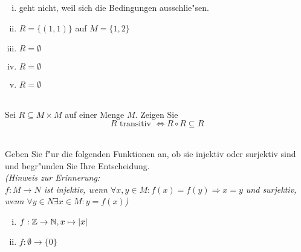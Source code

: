 \begin{loesung}
\begin{enumerate}[(i)]
\item geht nicht, weil sich die Bedingungen ausschlie"sen.
\item $R=\{(1,1)\}$ auf $M=\{1,2\}$
\item $R=\emptyset$
\item $R=\emptyset$
\item $R=\emptyset$
\end{enumerate}
\end{loesung}
\\
Sei $R\subseteq M\times M$ auf einer Menge $M$. Zeigen Sie \[R\mbox{ transitiv }\Leftrightarrow R\circ R\subseteq R\]

\\
Geben Sie f"ur die folgenden Funktionen an, ob sie injektiv oder surjektiv sind und begr"unden Sie Ihre Entscheidung.\\
\textit{(Hinweis zur Erinnerung:\\$f:M\to N$ ist injektiv, wenn $\forall x,y\in M:f(x)=f(y)\Rightarrow x=y$ und surjektiv, wenn $\forall y\in N\exists x\in M:y=f(x)$)}

\begin{enumerate}[(i)]
\item $f:\mathbb{Z}\to\mathbb{N}, x\mapsto |x|$
\item $f:\emptyset\to\{0\}$
\end{enumerate}

